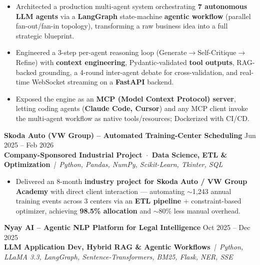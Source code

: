 \documentclass[a4paper,10pt]{article}
\newcommand{\projectEntry}[4]{%
  \vspace{1pt}%
  \noindent\textbf{\color{HeaderDark}#1} \hfill {\small\color{SubText}#2}\\[-4pt]%
  {\scriptsize\color{AccentTeal}\textbf{#3}} {\scriptsize\color{TechTag}\textit{\,|\, #4}}%
  \vspace{0pt}\par%
}
\begin{document}
\begin{itemize}[leftmargin=14pt, itemsep=0pt, parsep=0pt, topsep=1pt, label={\color{BulletColor}\textbf{--}}]
  \item {\small Architected a production multi-agent system orchestrating \textbf{7 autonomous LLM agents} via a \textbf{LangGraph} state-machine \textbf{agentic workflow} (parallel fan-out/fan-in topology), transforming a raw business idea into a full strategic blueprint.}
  \item {\small Engineered a 3-step per-agent reasoning loop (Generate$\rightarrow$Self-Critique$\rightarrow$Refine) with \textbf{context engineering}, Pydantic-validated \textbf{tool outputs}, RAG-backed grounding, a 4-round inter-agent debate for cross-validation, and real-time WebSocket streaming on a \textbf{FastAPI} backend.}
  \item {\small Exposed the engine as an \textbf{MCP (Model Context Protocol) server}, letting coding agents (\textbf{Claude Code, Cursor}) and any MCP client invoke the multi-agent workflow as native tools/resources; Dockerized with CI/CD.}
\end{itemize}

\vspace{2pt}

\projectEntry{Skoda Auto (VW Group) -- Automated Training-Center Scheduling}
  {Jun 2025 -- Feb 2026}
  {Company-Sponsored Industrial Project \,$\cdot$\, Data Science, ETL \& Optimization}
  {Python, Pandas, NumPy, Scikit-Learn, Tkinter, SQL}

\begin{itemize}[leftmargin=14pt, itemsep=0pt, parsep=0pt, topsep=1pt, label={\color{BulletColor}\textbf{--}}]
  \item {\small Delivered an 8-month \textbf{industry project for Skoda Auto / VW Group Academy} with direct client interaction --- automating $\sim$1,243 annual training events across 3 centers via an \textbf{ETL pipeline} + constraint-based optimizer, achieving \textbf{98.5\% allocation} and $\sim$80\% less manual overhead.}
\end{itemize}

\vspace{1pt}

\projectEntry{Nyay AI -- Agentic NLP Platform for Legal Intelligence}
  {Oct 2025 -- Dec 2025}
  {LLM Application Dev, Hybrid RAG \& Agentic Workflows}
  {Python, LLaMA 3.3, LangGraph, Sentence-Transformers, BM25, Flask, NER, SSE}
\end{document}
